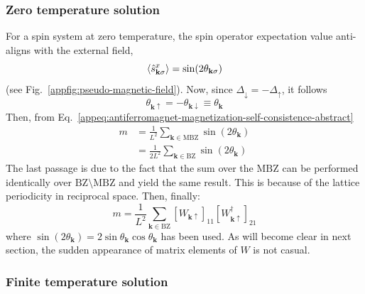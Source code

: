 \subsubsection{Zero temperature solution}

For a spin system at zero temperature, the spin operator expectation value anti-aligns with the external field,
\[
	\ev{\hat s_{\mathbf{k}\sigma}^x} = \sin(2\theta_{\mathbf{k}\sigma})
\]
(see Fig.~\ref{appfig:pseudo-magnetic-field}). Now, since $\Delta_\downarrow = - \Delta_\uparrow$, it follows
\[
	\theta_{\mathbf{k}\uparrow} = -\theta_{\mathbf{k}\downarrow} \equiv \theta_\mathbf{k}
\]
Then, from Eq.~\eqref{appeq:antiferromagnet-magnetization-self-consistence-abstract}
\[
\begin{aligned}
	m &= \frac{1}{L^2} \sum_{\mathbf{k} \in \mathrm{MBZ}} \sin(2\theta_\mathbf{k}) \\
	&= \frac{1}{2L^2} \sum_{\mathbf{k} \in \mathrm{BZ}} \sin(2\theta_\mathbf{k})
\end{aligned}
\]
The last passage is due to the fact that the sum over the $\mathrm{MBZ}$ can be performed identically over $\mathrm{BZ}\setminus\mathrm{MBZ}$ and yield the same result. This is because of the lattice periodicity in reciprocal space. Then, finally:
\begin{equation}\label{appeq:antiferromagnet-magnetization-self-consistence-zero-temperature}
	m = \frac{1}{L^2} \sum_{\mathbf{k} \in \mathrm{BZ}} [ W_{\mathbf{k}\uparrow} ]_{11} [ W_{\mathbf{k}\uparrow}^\dagger ]_{21}
\end{equation}
where $\sin(2\theta_\mathbf{k}) = 2 \sin\theta_\mathbf{k} \cos\theta_\mathbf{k}$ has been used. As will become clear in next section, the sudden appearance of matrix elements of $W$ is not casual.

\subsubsection{Finite temperature solution}

